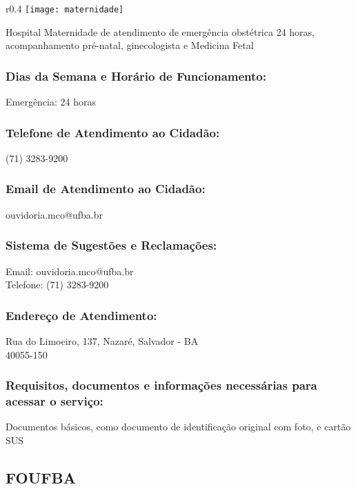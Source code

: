      \begin{wrapfigure}{r}{0.4\textwidth}
        \centering
        \texttt{[image: maternidade]}
    \end{wrapfigure}
    
    Hospital Maternidade de atendimento de emergência obstétrica 24 horas, acompanhamento pré-natal, ginecologista e Medicina Fetal

    
    \subsubsection{Dias da Semana e Horário de Funcionamento:}
            Emergência: 24 horas
    
    \subsubsection {Telefone de Atendimento ao Cidadão:}
            (71) 3283-9200

    \subsubsection{Email de Atendimento ao Cidadão:}
            ouvidoria.mco@ufba.br
    
    \subsubsection{Sistema de Sugestões e Reclamações:}
            Email: ouvidoria.mco@ufba.br \\ Telefone: (71) 3283-9200

    \subsubsection{Endereço de Atendimento:}
            Rua do Limoeiro, 137, Nazaré, Salvador - BA \\ 40055-150

    \subsubsection{Requisitos, documentos e informações necessárias para acessar o serviço:}
             Documentos básicos, como documento de identificação original com foto, e cartão SUS  
    \subsection{FOUFBA}
    
